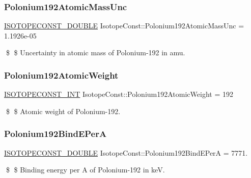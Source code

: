 \subsubsection{\texorpdfstring{Polonium192\+Atomic\+Mass\+Unc}{Polonium192AtomicMassUnc}}
{\footnotesize\ttfamily \mbox{\hyperlink{group___isotope_const-_macros_ga8f45a7272ce02c0b4c65c44636ed719a}{I\+S\+O\+T\+O\+P\+E\+C\+O\+N\+S\+T\+\_\+\+D\+O\+U\+B\+LE}} Isotope\+Const\+::\+Polonium192\+Atomic\+Mass\+Unc = 1.\+1926e-\/05}

\$ \$ Uncertainty in atomic mass of Polonium-\/192 in amu. \mbox{\label{group___isotope_const-_polonium-_po192_ga3b42ce342c53c2e17aa948e4d5635961}} 
\subsubsection{\texorpdfstring{Polonium192\+Atomic\+Weight}{Polonium192AtomicWeight}}
{\footnotesize\ttfamily \mbox{\hyperlink{group___isotope_const-_macros_ga5f18360b3e99483a35c32d789e62621c}{I\+S\+O\+T\+O\+P\+E\+C\+O\+N\+S\+T\+\_\+\+I\+NT}} Isotope\+Const\+::\+Polonium192\+Atomic\+Weight = 192}

\$ \$ Atomic weight of Polonium-\/192. \mbox{\label{group___isotope_const-_polonium-_po192_gaab0725220c7320ff2af97d6124d36fa5}} 
\subsubsection{\texorpdfstring{Polonium192\+Bind\+E\+PerA}{Polonium192BindEPerA}}
{\footnotesize\ttfamily \mbox{\hyperlink{group___isotope_const-_macros_ga8f45a7272ce02c0b4c65c44636ed719a}{I\+S\+O\+T\+O\+P\+E\+C\+O\+N\+S\+T\+\_\+\+D\+O\+U\+B\+LE}} Isotope\+Const\+::\+Polonium192\+Bind\+E\+PerA = 7771.}

\$ \$ Binding energy per A of Polonium-\/192 in keV. \mbox{\label{group___isotope_const-_polonium-_po192_ga01cf7311f0a685ef3091928261f19a4e}} 
